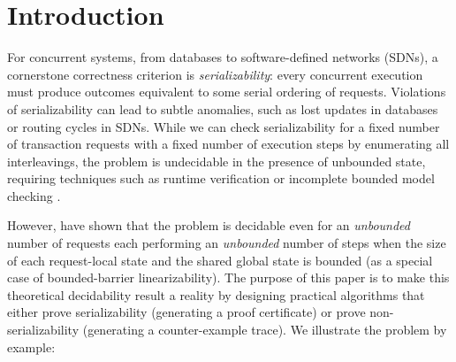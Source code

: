 \section{Introduction}
\label{sec:introduction}

For concurrent systems, from databases to software-defined networks (SDNs), a cornerstone correctness criterion is \emph{serializability}: every concurrent execution must produce outcomes equivalent to some serial ordering of requests. Violations of serializability can lead to subtle anomalies, such as lost updates in databases or routing cycles in SDNs.
While we can check serializability for a fixed number of transaction requests with a fixed number of execution steps by enumerating all interleavings, the problem is undecidable in the presence of unbounded state, requiring techniques such as runtime verification or incomplete bounded model checking \cite{WaSt06a,WaSt06b,FlFrYi08,FaMa08,SiMaWaGu11a,SiMaWaGu11b,Pa79,AlMcPe96,BiEn19}.

However, \citet{BoEmEnHa13} have shown that the problem is decidable even for an \emph{unbounded} number of requests each performing an \emph{unbounded} number of steps when the size of each request-local state and the shared global state is bounded (as a special case of bounded-barrier linearizability). The purpose of this paper is to make this theoretical decidability result a reality by designing practical algorithms that either prove serializability (generating a proof certificate) or prove non-serializability (generating a counter-example trace).
% 
We illustrate the problem by example:


